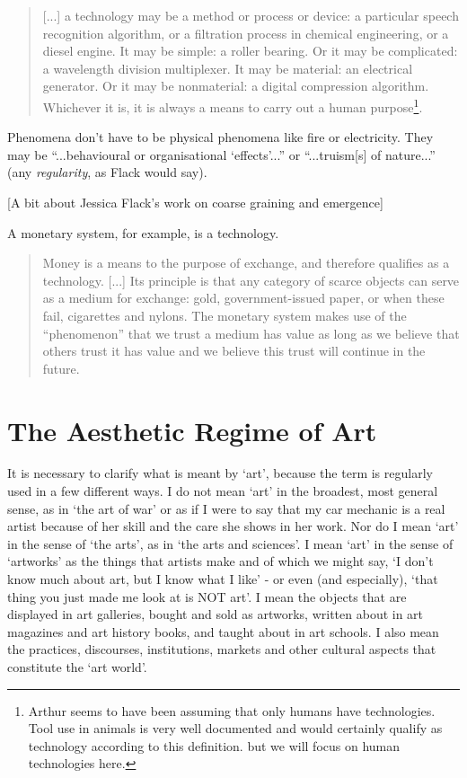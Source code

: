 \documentclass[letterpaper]{article}
\begin{document}
    \begin{quote}
        [...] a technology may be a method or process or device: a particular speech recognition algorithm, or a filtration process in chemical engineering, or a diesel engine. It may be simple: a roller bearing. Or it may be complicated: a wavelength division multiplexer. It may be material: an electrical generator. Or it may be nonmaterial: a digital compression algorithm. Whichever it is, it is always a means to carry out a human purpose\footnote{
            Arthur seems to have been assuming that only humans have technologies. Tool use in animals is very well documented \citep{BeckAnmlTlUs2011} and would certainly qualify as technology according to this definition. \citep[p.28]{theNatureOfTechnology2009} but we will focus on human technologies here.
        }.
    \end{quote}

    Phenomena don't have to be physical phenomena like fire or electricity. They may be “...behavioural or organisational ‘effects’...” \citep[p.55]{theNatureOfTechnology2009} or “...truism[s] of nature...” \citep[p.45]{theNatureOfTechnology2009} (any \emph{regularity}, as Flack would say). 

    [A bit about Jessica Flack's work on coarse graining and emergence]

    A monetary system, for example, is a technology.

    \begin{quote}
        Money is a means to the purpose of exchange, and therefore qualifies as a technology. [...] Its principle is that any category of scarce objects can serve as a medium for exchange: gold, government-issued paper, or when these fail, cigarettes and nylons. The monetary system makes use of the “phenomenon” that we trust a medium has value as long as we believe that others trust it has value and we believe this trust will continue in the future. \citep[p.55]{theNatureOfTechnology2009}
    \end{quote}

\section{The Aesthetic Regime of Art}

    It is necessary to clarify what is meant by ‘art’, because the term is regularly used in a few different ways. I do not mean ‘art’ in the broadest, most general sense, as in ‘the art of war’ or as if I were to say that my car mechanic is a real artist because of her skill and the care she shows in her work. Nor do I mean ‘art’ in the sense of ‘the arts’, as in ‘the arts and sciences’. I mean ‘art’ in the sense of ‘artworks’ as the things that artists make and of which we might say, ‘I don't know much about art, but I know what I like’ - or even (and especially), ‘that thing you just made me look at is NOT art’. I mean the objects that are displayed in art galleries, bought and sold as artworks, written about in art magazines and art history books, and taught about in art schools. I also mean the practices, discourses, institutions, markets and other cultural aspects that constitute the ‘art world’.
\end{document}
